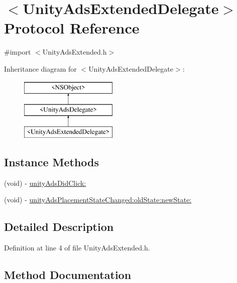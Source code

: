 \hypertarget{protocol_unity_ads_extended_delegate-p}{}\section{$<$Unity\+Ads\+Extended\+Delegate$>$ Protocol Reference}
\label{protocol_unity_ads_extended_delegate-p}


{\ttfamily \#import $<$Unity\+Ads\+Extended.\+h$>$}

Inheritance diagram for $<$Unity\+Ads\+Extended\+Delegate$>$\+:\begin{figure}[H]
\begin{center}
\leavevmode
\includegraphics[height=3.000000cm]{protocol_unity_ads_extended_delegate-p}
\end{center}
\end{figure}
\subsection*{Instance Methods}
\begin{DoxyCompactItemize}
\item 
(void) -\/ \mbox{\hyperlink{protocol_unity_ads_extended_delegate-p_a8087585e0bb3fca5127c2c625b44f58a}{unity\+Ads\+Did\+Click\+:}}
\item 
(void) -\/ \mbox{\hyperlink{protocol_unity_ads_extended_delegate-p_ad995ca2891cbe89df2307d862654d6f6}{unity\+Ads\+Placement\+State\+Changed\+:old\+State\+:new\+State\+:}}
\end{DoxyCompactItemize}


\subsection{Detailed Description}


Definition at line 4 of file Unity\+Ads\+Extended.\+h.



\subsection{Method Documentation}
\mbox{\label{protocol_unity_ads_extended_delegate-p_a8087585e0bb3fca5127c2c625b44f58a}} 
